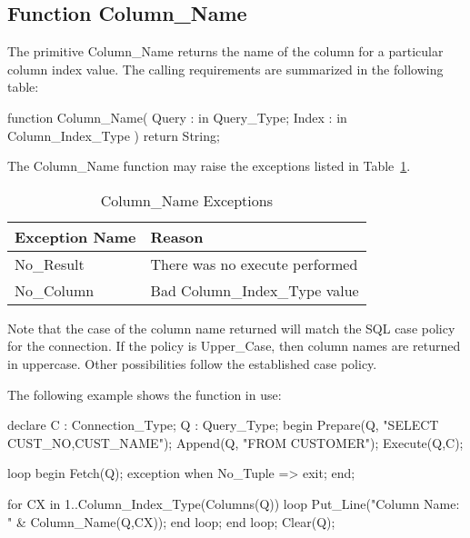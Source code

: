 \documentclass[english,letterpaper]{book}
\begin{document}
\subsection{Function Column\_Name}

The primitive Column\_Name returns the name of the column for a particular
column index value. The calling requirements
are summarized in the following table:

\begin{Code}
function Column_Name(
   Query : in Query_Type;
   Index : in Column_Index_Type
) return String;
\end{Code}

The Column\_Name function may raise the exceptions listed in Table~\ref{t:cnx}.

\begin{table}
   \begin{center}
      \begin{tabular}{ll}
         Exception Name    &  Reason\\
         \hline 
         No\_Result        &  There was no execute performed\\
         No\_Column        &  Bad Column\_Index\_Type value\\
      \end{tabular}
   \end{center}
   \caption{Column\_Name Exceptions}\label{t:cnx}
\end{table}

Note that the case of the column name returned will match the SQL
case policy for the connection. If the policy is Upper\_Case, then
column names are returned in uppercase. Other possibilities follow
the established case policy.

The following example shows the function in use:

\begin{Example}
declare
   C : Connection_Type;
   Q : Query_Type;
begin
   Prepare(Q, "SELECT CUST_NO,CUST_NAME");
   Append(Q,  "FROM CUSTOMER");
   Execute(Q,C);

   loop
      begin
         Fetch(Q);
      exception
         when No_Tuple =>
            exit;
      end;

      for CX in 1..Column_Index_Type(Columns(Q)) loop
         Put_Line("Column Name: " & Column_Name(Q,CX));
      end loop;
   end loop;
   Clear(Q);
\end{Example}
\end{document}

